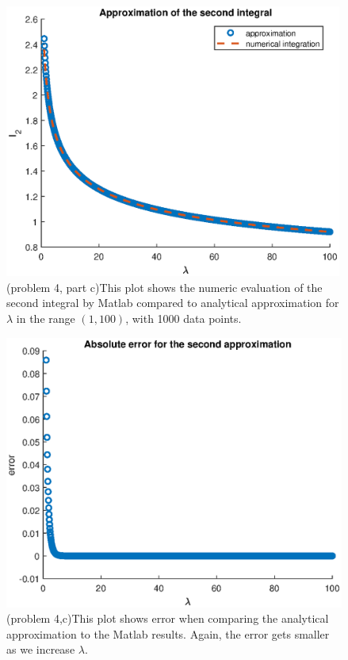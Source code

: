 \documentclass[12pt,letterpaper]{article}
\begin{document}
\begin{figure}[h]
    \centering
    \includegraphics[height=9cm]{problem4/hw3_3_c.eps}
    \caption{(problem 4, part c)This plot shows the numeric evaluation of the second integral by Matlab compared to analytical approximation for $\lambda$ in the range $(1,100)$, with 1000 data points.  }
    \label{fig:fapp2}
\end{figure}


\begin{figure}[h]
    \centering
    \includegraphics[height=9cm]{problem4/hw3_3_cerror.eps}
    \caption{(problem 4,c)This plot shows error when comparing the analytical approximation to the Matlab results. Again, the error gets smaller as we increase $\lambda$. }
    \label{fig:ferror2}
\end{figure}
\end{document}
